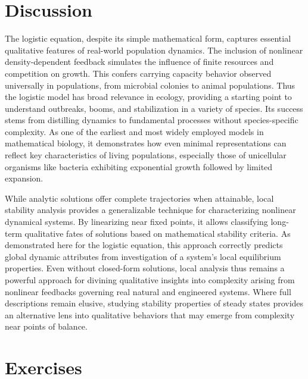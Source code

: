 \section{Discussion}

The logistic equation, despite its simple mathematical form, captures essential qualitative features of real-world population dynamics. The inclusion of nonlinear density-dependent feedback simulates the influence of finite resources and competition on growth. This confers carrying capacity behavior observed universally in populations, from microbial colonies to animal populations. Thus the logistic model has broad relevance in ecology, providing a starting point to understand outbreaks, booms, and stabilization in a variety of species. Its success stems from distilling dynamics to fundamental processes without species-specific complexity. As one of the earliest and most widely employed models in mathematical biology, it demonstrates how even minimal representations can reflect key characteristics of living populations, especially those of unicellular organisms like bacteria exhibiting exponential growth followed by limited expansion.

While analytic solutions offer complete trajectories when attainable, local stability analysis provides a generalizable technique for characterizing nonlinear dynamical systems. By linearizing near fixed points, it allows classifying long-term qualitative fates of solutions based on mathematical stability criteria. As demonstrated here for the logistic equation, this approach correctly predicts global dynamic attributes from investigation of a system's local equilibrium properties. Even without closed-form solutions, local analysis thus remains a powerful approach for divining qualitative insights into complexity arising from nonlinear feedbacks governing real natural and engineered systems. Where full descriptions remain elusive, studying stability properties of steady states provides an alternative lens into qualitative behaviors that may emerge from complexity near points of balance.

\section*{Exercises}

